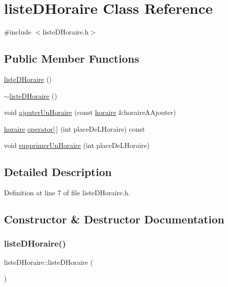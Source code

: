 \hypertarget{classliste_d_horaire}{}\section{liste\+D\+Horaire Class Reference}
\label{classliste_d_horaire}


{\ttfamily \#include $<$liste\+D\+Horaire.\+h$>$}

\subsection*{Public Member Functions}
\begin{DoxyCompactItemize}
\item 
\hyperlink{classliste_d_horaire_a614fd89aa8fb95f9068613fc1974f307}{liste\+D\+Horaire} ()
\item 
\hyperlink{classliste_d_horaire_a497a28a7b80534317d7ec387d4c8714b}{$\sim$liste\+D\+Horaire} ()
\item 
void \hyperlink{classliste_d_horaire_a30f35985eb14300ad9cf8f44ef9d651e}{ajouter\+Un\+Horaire} (const \hyperlink{classhoraire}{horaire} \&horaire\+A\+Ajouter)
\item 
\hyperlink{classhoraire}{horaire} \hyperlink{classliste_d_horaire_a23b08c00c1d32405bd84045ca9b6208a}{operator\mbox{[}$\,$\mbox{]}} (int place\+De\+L\+Horaire) const
\item 
void \hyperlink{classliste_d_horaire_ad7e5d53b1c64285c908f9fe2e60aa61f}{supprimer\+Un\+Horaire} (int place\+De\+L\+Horaire)
\end{DoxyCompactItemize}


\subsection{Detailed Description}


Definition at line 7 of file liste\+D\+Horaire.\+h.



\subsection{Constructor \& Destructor Documentation}
\hypertarget{classliste_d_horaire_a614fd89aa8fb95f9068613fc1974f307}{}\label{classliste_d_horaire_a614fd89aa8fb95f9068613fc1974f307} 
\subsubsection{\texorpdfstring{liste\+D\+Horaire()}{listeDHoraire()}}
{\footnotesize\ttfamily liste\+D\+Horaire\+::liste\+D\+Horaire (\begin{DoxyParamCaption}{ }\end{DoxyParamCaption})}



